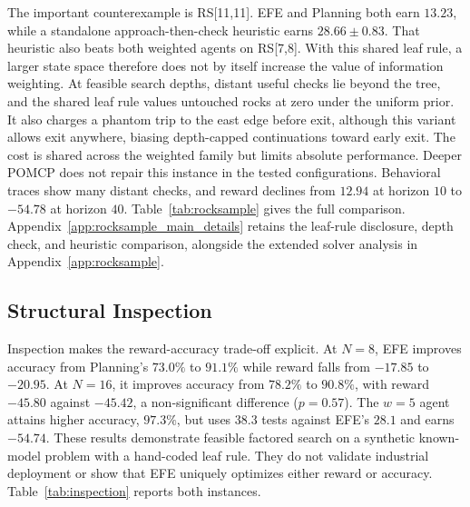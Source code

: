 \documentclass[manuscript, screen, review]{jair}
\begin{document}
The important counterexample is RS[11,11]. EFE and Planning both earn $13.23$, while a standalone approach-then-check heuristic earns $28.66\pm0.83$. That heuristic also beats both weighted agents on RS[7,8]. With this shared leaf rule, a larger state space therefore does not by itself increase the value of information weighting. At feasible search depths, distant useful checks lie beyond the tree, and the shared leaf rule values untouched rocks at zero under the uniform prior. It also charges a phantom trip to the east edge before exit, although this variant allows exit anywhere, biasing depth-capped continuations toward early exit. The cost is shared across the weighted family but limits absolute performance. Deeper POMCP does not repair this instance in the tested configurations. Behavioral traces show many distant checks, and reward declines from $12.94$ at horizon $10$ to $-54.78$ at horizon $40$. Table~\ref{tab:rocksample} gives the full comparison. Appendix~\ref{app:rocksample_main_details} retains the leaf-rule disclosure, depth check, and heuristic comparison, alongside the extended solver analysis in Appendix~\ref{app:rocksample}.

\subsection{Structural Inspection}
\label{sec:inspection}

Inspection makes the reward-accuracy trade-off explicit. At $N{=}8$, EFE improves accuracy from Planning's $73.0\%$ to $91.1\%$ while reward falls from $-17.85$ to $-20.95$. At $N{=}16$, it improves accuracy from $78.2\%$ to $90.8\%$, with reward $-45.80$ against $-45.42$, a non-significant difference ($p=0.57$). The $w{=}5$ agent attains higher accuracy, $97.3\%$, but uses $38.3$ tests against EFE's $28.1$ and earns $-54.74$. These results demonstrate feasible factored search on a synthetic known-model problem with a hand-coded leaf rule. They do not validate industrial deployment or show that EFE uniquely optimizes either reward or accuracy. Table~\ref{tab:inspection} reports both instances.
\end{document}
